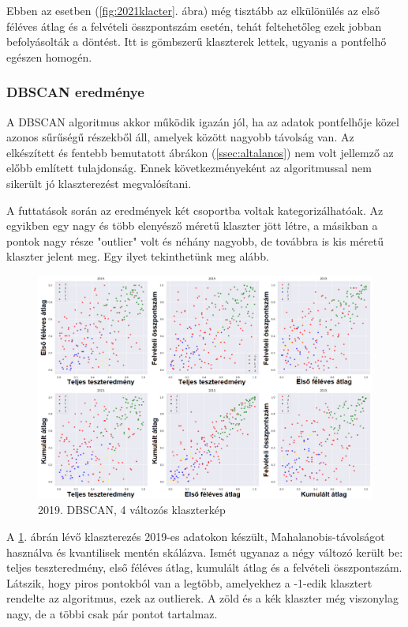 \documentclass[12pt]{article}
\begin{document}
Ebben az esetben (\ref{fig:2021klacter}. ábra) még tisztább az elkülönülés az első féléves átlag és a felvételi összpontszám esetén, tehát feltehetőleg ezek jobban befolyásolták a döntést. Itt is gömbszerű klaszterek lettek, ugyanis a pontfelhő egészen homogén.

\subsubsection{DBSCAN eredménye}

A DBSCAN algoritmus akkor működik igazán jól, ha az adatok pontfelhője közel azonos sűrűségű részekből áll, amelyek között nagyobb távolság van. Az elkészített és fentebb bemutatott ábrákon (\ref{ssec:altalanos}) nem volt jellemző az előbb említett tulajdonság. Ennek következményeként az algoritmussal nem sikerült jó klaszterezést megvalósítani.

A futtatások során az eredmények két csoportba voltak kategorizálhatóak. Az egyikben egy nagy és több elenyésző méretű klaszter jött létre, a másikban a pontok nagy része "outlier" volt és néhány nagyobb, de továbbra is kis méretű klaszter jelent meg. Egy ilyet tekinthetünk meg alább.

\begin{figure}[H]
\centering
\includegraphics[width = \textwidth]{kepek/dbscan2.png}
\caption{2019. DBSCAN, 4 változós klaszterkép}
\label{fig:dbscan2}
\end{figure}

A \ref{fig:dbscan2}. ábrán lévő klaszterezés 2019-es adatokon készült, Mahalanobis-távolságot használva és kvantilisek mentén skálázva. Ismét ugyanaz a négy változó került be: teljes teszteredmény, első féléves átlag, kumulált átlag és a felvételi összpontszám. Látszik, hogy piros pontokból van a legtöbb, amelyekhez a -1-edik klasztert rendelte az algoritmus, ezek az outlierek. A zöld és a kék klaszter még viszonylag nagy, de a többi csak pár pontot tartalmaz.
\end{document}
